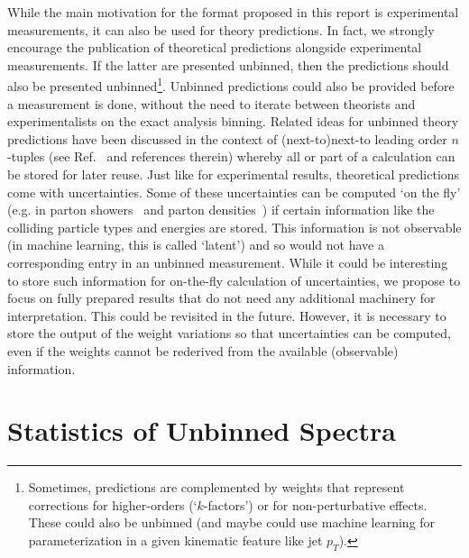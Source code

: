 \documentclass[a4paper,11pt]{article}
\begin{document}
While the main motivation for the format proposed in this report is experimental measurements, it can also be used for theory predictions.  In fact, we strongly encourage the publication of theoretical predictions alongside experimental measurements.
If the latter are presented unbinned, then the predictions should also be presented unbinned\footnote{Sometimes, predictions are complemented by weights that represent corrections for higher-orders (`$k$-factors') or for non-perturbative effects.  These could also be unbinned (and maybe could use machine learning for parameterization in a given kinematic feature like jet $p_T$).}.  Unbinned predictions could also be provided before a measurement is done, without the need to iterate between theorists and experimentalists on the exact analysis binning.  Related ideas for unbinned theory predictions have been discussed in the context of (next-to)next-to leading order $n$-tuples (see Ref.~\cite{Heinrich:2016jad} and references therein) whereby all or part of a calculation can be stored for later reuse.  Just like for experimental results, theoretical predictions come with uncertainties.  Some of these uncertainties can be computed `on the fly' (e.g. in parton showers~\cite{Mrenna:2016sih,Bellm:2016voq,Bothmann:2016nao} and parton densities~\cite{Buckley:2014ana}) if certain information like the colliding particle types and energies are stored.  This information is not observable (in machine learning, this is called `latent') and so would not have a corresponding entry in an unbinned measurement.  While it could be interesting to store such information for on-the-fly calculation of uncertainties, we propose to focus on fully prepared results that do not need any additional machinery for interpretation.  This could be revisited in the future.  However, it is necessary to store the output of the weight variations so that uncertainties can be computed, even if the weights cannot be rederived from the available (observable) information.

\section{Statistics of Unbinned Spectra}
\label{sec:statistcs}
\end{document}
